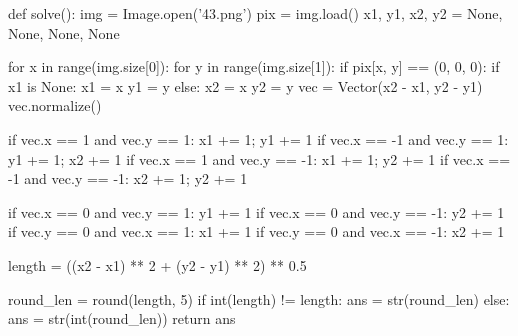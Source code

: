 \documentclass[12pt]{article}
\begin{document}
    \begin{listing}[H]
    \begin{pythoncode}
def solve():
    img = Image.open('43.png')
    pix = img.load()
    x1, y1, x2, y2 = None, None, None, None

    for x in range(img.size[0]):
        for y in range(img.size[1]):
            if pix[x, y] == (0, 0, 0):
                if x1 is None:
                    x1 = x
                    y1 = y
                else:
                    x2 = x
                    y2 = y
    vec = Vector(x2 - x1, y2 - y1)
    vec.normalize()

    if vec.x == 1 and vec.y == 1: x1 += 1; y1 += 1
    if vec.x == -1 and vec.y == 1: y1 += 1; x2 += 1
    if vec.x == 1 and vec.y == -1: x1 += 1; y2 += 1
    if vec.x == -1 and vec.y == -1: x2 += 1; y2 += 1

    if vec.x == 0 and vec.y == 1: y1 += 1
    if vec.x == 0 and vec.y == -1: y2 += 1
    if vec.y == 0 and vec.x == 1: x1 += 1
    if vec.y == 0 and vec.x == -1: x2 += 1

    length = ((x2 - x1) ** 2 + (y2 - y1) ** 2) ** 0.5

    round_len = round(length, 5)
    if int(length) != length:
        ans = str(round_len)
    else:
        ans = str(int(round_len))
    return ans
        \end{pythoncode}
    \end{listing}

%
%
%
\end{document}
